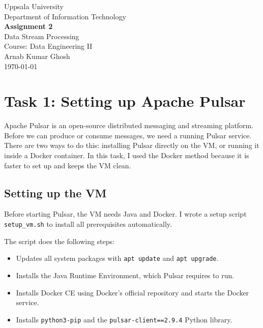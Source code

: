 \documentclass[11pt,a4paper]{article}
\begin{document}
\begin{titlepage}
  \centering
  \vspace*{2cm}
  {\large Uppsala University\\[0.3em]
   Department of Information Technology\\[2cm]}
  {\LARGE\bfseries Assignment 2\\[0.5em]}
  {\Large Data Stream Processing\\[2cm]}
  {\large Course: Data Engineering II\\[1.5cm]}
  {\normalsize Arnab Kumar Ghosh\\[0.5cm]}
  {\normalsize \today\\[3cm]}
  \vfill
\end{titlepage}

\tableofcontents
\newpage

\section{Task 1: Setting up Apache Pulsar}

Apache Pulsar is an open-source distributed messaging and streaming platform.
Before we can produce or consume messages, we need a running Pulsar service.
There are two ways to do this: installing Pulsar directly on the VM, or running it
inside a Docker container. In this task, I used the Docker method because it is
faster to set up and keeps the VM clean.

\subsection{Setting up the VM}

Before starting Pulsar, the VM needs Java and Docker. I wrote a setup script
\texttt{setup\_vm.sh} to install all prerequisites automatically.

The script does the following steps:

\begin{itemize}[leftmargin=1.5cm]
  \item Updates all system packages with \texttt{apt update} and \texttt{apt upgrade}.
  \item Installs the Java Runtime Environment, which Pulsar requires to run.
  \item Installs Docker CE using Docker's official repository and starts the Docker service.
  \item Installs \texttt{python3-pip} and the
        \texttt{pulsar-client==2.9.4} Python library.
\end{itemize}
\end{document}

